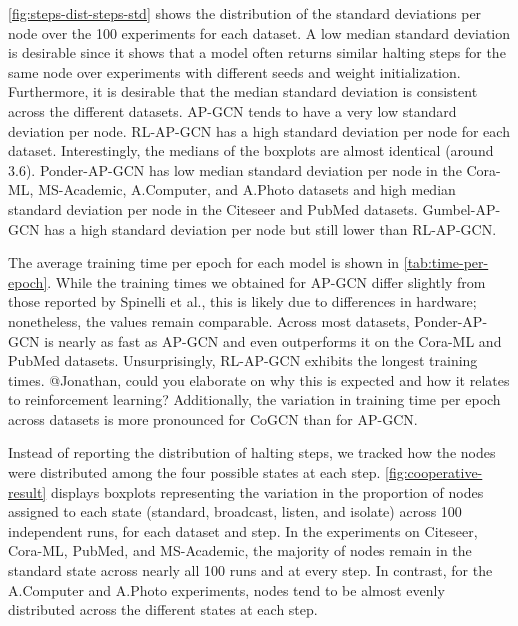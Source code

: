 \documentclass{gdl}
\begin{document}
\autoref{fig:steps-dist-steps-std} shows the distribution of the standard deviations per node over the 100 experiments for each dataset. A low median standard deviation is desirable since it shows that a model often returns similar halting steps for the same node over experiments with different seeds and weight initialization. Furthermore, it is desirable that the median standard deviation is consistent across the different datasets. AP-GCN tends to have a very low standard deviation per node. RL-AP-GCN has a high standard deviation per node for each dataset. Interestingly, the medians of the boxplots are almost identical (around 3.6). Ponder-AP-GCN has low median standard deviation per node in the Cora-ML, MS-Academic, A.Computer, and A.Photo datasets and high median standard deviation per node in the Citeseer and PubMed datasets. Gumbel-AP-GCN has a high standard deviation per node but still lower than RL-AP-GCN. 

The average training time per epoch for each model is shown in \autoref{tab:time-per-epoch}. While the training times we obtained for AP-GCN differ slightly from those reported by Spinelli et al., this is likely due to differences in hardware; nonetheless, the values remain comparable. Across most datasets, Ponder-AP-GCN is nearly as fast as AP-GCN and even outperforms it on the Cora-ML and PubMed datasets. Unsurprisingly, RL-AP-GCN exhibits the longest training times. @Jonathan, could you elaborate on why this is expected and how it relates to reinforcement learning? Additionally, the variation in training time per epoch across datasets is more pronounced for CoGCN than for AP-GCN.

Instead of reporting the distribution of halting steps, we tracked how the nodes were distributed among the four possible states at each step. \autoref{fig:cooperative-result} displays boxplots representing the variation in the proportion of nodes assigned to each state (standard, broadcast, listen, and isolate) across 100 independent runs, for each dataset and step. In the experiments on Citeseer, Cora-ML, PubMed, and MS-Academic, the majority of nodes remain in the standard state across nearly all 100 runs and at every step. In contrast, for the A.Computer and A.Photo experiments, nodes tend to be almost evenly distributed across the different states at each step.
\end{document}
